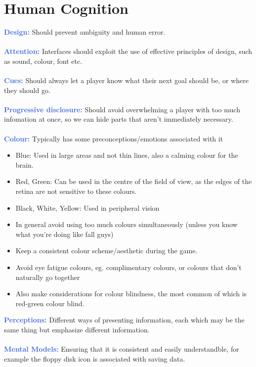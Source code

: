 \documentclass[a4paper,10pt]{article}
\begin{document}
\section*{Human Cognition}
\textcolor{RoyalBlue}{\textbf{Design:}} Should prevent ambiguity and human error. \\\\
\textcolor{RoyalBlue}{\textbf{Attention:}} Interfaces should exploit the use of effective principles of design, such as sound, colour, font etc. \\\\
\textcolor{RoyalBlue}{\textbf{Cues:}} Should always let a player know what their next goal should be, or where they should go. \\\\
\textcolor{RoyalBlue}{\textbf{Progressive disclosure:}} Should avoid overwhelming a player with too much infomation at once, so we can hide parts that aren't immediately necessary. \\\\
\textcolor{RoyalBlue}{\textbf{Colour:}} Typically has some preconceptions/emotions associated with it
\renewcommand{\labelitemi}{\textperiodcentered}
\begin{itemize}
\item Blue: Used in large areas and not thin lines, also a calming colour for the brain.
\item Red, Green: Can be used in the centre of the field of view, as the edges of the retina are not sensitive to these colours. 
\item Black, White, Yellow: Used in peripheral vision 
\item In general avoid using too much colours simultaneously (unless you know what you're doing like fall guys) 
\item Keep a consistent colour scheme/aesthetic during the game.
\item Avoid eye fatigue colours, eg. complimentary colours, or colours that don't naturally go together
\item Also make considerations for colour blindness, the most common of which is red-green colour blind. 
\end{itemize}
\textcolor{RoyalBlue}{\textbf{Perceptions:}} Different ways of presenting information, each which may be the same thing but emphasize different information. \\\\
\textcolor{RoyalBlue}{\textbf{Mental Models:}} Ensuring that it is consistent and easily understandble, for example the floppy disk icon is associated with saving data. \\\\
\end{document}
